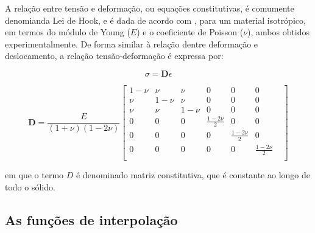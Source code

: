 A relação entre tensão e deformação, ou equações constitutivas, é comumente denomianda Lei de Hook, e é dada de acordo com , para um material isotrópico, em termos do módulo de Young ($E$) e o coeficiente de Poisson ($\nu$), ambos obtidos experimentalmente. De forma similar à relação dentre deformação e deslocamento, a relação tensão-deformação é expressa por:

\begin{equation}
    \sigma = \mathbf{D} \epsilon
\end{equation}

\begin{equation} \label{eq:matriz_constitutiva}
    \mathbf{D} = \frac{E}{(1+\nu)(1 - 2\nu)} \begin{bmatrix}
        1 - \nu & \nu & \nu & 0 & 0 & 0 \\
        \nu & 1 - \nu & \nu & 0 & 0 & 0 \\
        \nu & \nu & 1 - \nu & 0 & 0 & 0 \\
        0 & 0 & 0 & \frac{1 - 2\nu}{2} & 0 & 0 \\
        0 & 0 & 0 & 0 &\frac{1 - 2\nu}{2} & 0 \\
        0 & 0 & 0 & 0 & 0 &\frac{1 - 2\nu}{2} & \\
    \end{bmatrix}
\end{equation}

em que o termo $D$ é denominado matriz constitutiva, que é constante ao longo de todo o sólido.

\subsection{As funções de interpolação}

